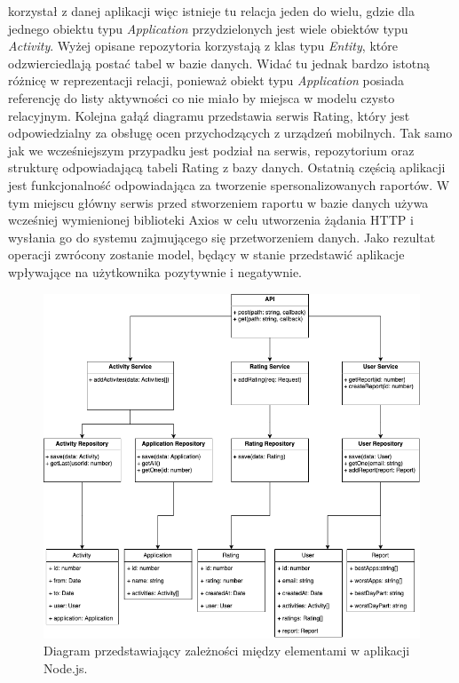 \documentclass[a4paper,twoside,12pt]{book}
\begin{document}
\begin{description}
korzystał z danej aplikacji więc istnieje tu relacja jeden do wielu, gdzie dla jednego obiektu typu \textit{Application} przydzielonych jest wiele obiektów typu \textit{Activity}. Wyżej opisane repozytoria korzystają z klas typu \textit{Entity}, które odzwierciedlają postać tabel w bazie danych. Widać tu jednak bardzo istotną różnicę w reprezentacji relacji, ponieważ obiekt typu \textit{Application} posiada referencję do listy aktywności co nie miało by miejsca w modelu czysto relacyjnym. Kolejna gałąź diagramu przedstawia serwis Rating, który jest odpowiedzialny za obsługę ocen  przychodzących z urządzeń mobilnych. Tak samo jak we wcześniejszym przypadku jest podział na serwis, repozytorium oraz strukturę odpowiadającą tabeli Rating z bazy danych. Ostatnią częścią aplikacji jest funkcjonalność odpowiadająca za tworzenie spersonalizowanych raportów. W tym miejscu główny serwis przed stworzeniem raportu w bazie danych używa wcześniej wymienionej biblioteki Axios w celu utworzenia żądania HTTP i wysłania go do systemu zajmującego się przetworzeniem danych. Jako rezultat operacji zwrócony zostanie model, będący w stanie przedstawić aplikacje wpływające na użytkownika pozytywnie i negatywnie.

\begin{figure}[h!]
    \centering
    \includegraphics[width=\textwidth]{images/track_apps_backend_diagram.png}
    \caption{Diagram przedstawiający zależności między elementami w aplikacji Node.js.\protect\footnotemark}
    \label{fig:backend_uml}
\end{figure}


\end{description}
\end{document}
